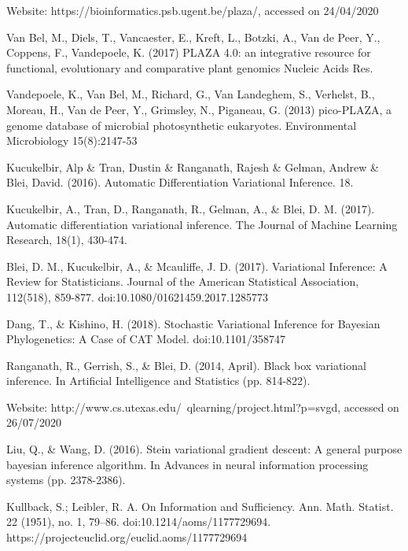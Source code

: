 
\begin{thebibliography}{50}

Website: https://bioinformatics.psb.ugent.be/plaza/, accessed on 24/04/2020

Van Bel, M., Diels, T., Vancaester, E., Kreft, L., Botzki, A., Van de Peer, Y., Coppens, F., Vandepoele, K. (2017) PLAZA 4.0: an integrative resource for functional, evolutionary and comparative plant genomics Nucleic Acids Res.

Vandepoele, K., Van Bel, M., Richard, G., Van Landeghem, S., Verhelst, B., Moreau, H., Van de Peer, Y., Grimsley, N., Piganeau, G. (2013) pico-PLAZA, a genome database of microbial photosynthetic eukaryotes. Environmental Microbiology 15(8):2147-53

Kucukelbir, Alp \& Tran, Dustin \& Ranganath, Rajesh \& Gelman, Andrew \& Blei, David. (2016). Automatic Differentiation Variational Inference. 18. 

Kucukelbir, A., Tran, D., Ranganath, R., Gelman, A., \& Blei, D. M. (2017). Automatic differentiation variational inference. The Journal of Machine Learning Research, 18(1), 430-474.

Blei, D. M., Kucukelbir, A., \& Mcauliffe, J. D. (2017). Variational Inference: A Review for Statisticians. Journal of the American Statistical Association, 112(518), 859-877. doi:10.1080/01621459.2017.1285773

Dang, T., \& Kishino, H. (2018). Stochastic Variational Inference for Bayesian Phylogenetics: A Case of CAT Model. doi:10.1101/358747

Ranganath, R., Gerrish, S., \& Blei, D. (2014, April). Black box variational inference. In Artificial Intelligence and Statistics (pp. 814-822).

Website: http://www.cs.utexas.edu/~qlearning/project.html?p=svgd, accessed on 26/07/2020

Liu, Q., \& Wang, D. (2016). Stein variational gradient descent: A general purpose bayesian inference algorithm. In Advances in neural information processing systems (pp. 2378-2386).

Kullback, S.; Leibler, R. A. On Information and Sufficiency. Ann. Math. Statist. 22 (1951), no. 1, 79--86. doi:10.1214/aoms/1177729694. https://projecteuclid.org/euclid.aoms/1177729694


\end{thebibliography}
